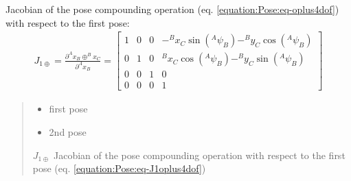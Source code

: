 \documentclass[letterpaper,10pt,english]{sphinxmanual}
\begin{document}
\begin{fulllineitems}
\begin{fulllineitems}
\label{\detokenize{Pose:Pose.Pose4D.J_1oplus}}
\pysigstartsignatures
{}
\pysigstopsignatures
\sphinxAtStartPar
Jacobian of the pose compounding operation (eq. \eqref{equation:Pose:eq-oplus4dof}) with respect to the first pose:
\begin{equation}\label{equation:Pose:eq-J1oplus4dof}
\begin{split}J_{1\oplus}=\frac{\partial  ^Ax_B \oplus ^Bx_C}{\partial ^Ax_B} =
\begin{bmatrix}
    1 & 0 & 0 & -^Bx_C \sin(^A\psi_B) - ^By_C \cos(^A\psi_B) \\
    0 & 1 & 0 & ^Bx_C \cos(^A\psi_B) - ^By_C \sin(^A\psi_B) \\
    0 & 0 & 1 & 0 \\
    0 & 0 & 0 & 1
\end{bmatrix}\end{split}
\end{equation}\begin{quote}\begin{description}
\begin{itemize}
\item {} 
\sphinxAtStartPar
{} \textendash{} first pose

\item {} 
\sphinxAtStartPar
{} \textendash{} 2nd pose

\end{itemize}

\sphinxAtStartPar
\(J_{1\oplus}\) Jacobian of the pose compounding operation with respect to the first pose (eq. \eqref{equation:Pose:eq-J1oplus4dof})

\end{description}\end{quote}

\end{fulllineitems}



\end{fulllineitems}
\end{document}
